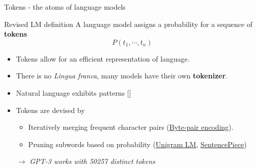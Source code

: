 \documentclass[10pt]{beamer}
\newcommand{\citeme}[1]{{\xspace\color{scAqua} \scriptsize [\cite{#1}]}}
\newcommand{\feature}[1]{{\color{scLime} \textbf{#1}}}
\newcommand{\remark}[1]{{\par \color{scGrape} \ensuremath{\rightarrow} \emph{#1}}}
\begin{document}
\begin{frame}{Tokens - the atoms of language models}
\begin{exampleblock}{Revised LM definition}
	A language model assigns a probability for a sequence of \feature{tokens}
	$$
	P(t_1, \cdots, t_{n})
	$$
\end{exampleblock}
\begin{itemize}
	\item Tokens allow for an efficient representation of language.
	\item There is no \emph{Lingua franca}, many models have their own \feature{tokenizer}. 
	\item Natural language exhibits patterns\citeme{Li1992,Piantadosi2014}
	\item Tokens are devised by 
			\begin{itemize}
			\item Iteratively merging frequent character pairs (\href{https://sebastianraschka.com/blog/2025/bpe-from-scratch.html}{Byte-pair encoding}).
			\item Pruning subwords based on probability (\href{https://medium.com/mti-technology/n-gram-language-model-b7c2fc322799}{Unigram LM}, \href{https://github.com/google/sentencepiece}{SentencePiece})
		\end{itemize}
	 \vspace{0.2cm} \par \remark{GPT-3 works with 50257 distinct tokens}
\end{itemize}
\end{frame}
\end{document}
